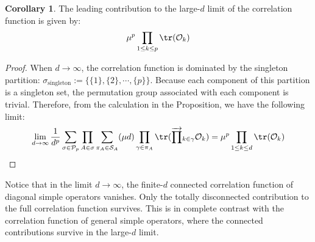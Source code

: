 \documentclass[a4paper,11pt]{article}
\theoremstyle{definition}
\numberwithin{equation}{section}
\newtheorem{corollary}[lemma]{Corollary}
\begin{document}
\begin{corollary}
    The leading contribution to the large-$d$ limit of the correlation function is given by:
    \begin{equation}
        \mu^p\prod_{1\leq k\leq  p}\tr(\mathcal{O}_k)
    \end{equation}
\end{corollary}
\begin{proof}
    When $d\rightarrow \infty$, the correlation function is dominated by the singleton partition: $\sigma_\text{singleton}:=\{\{1\},\{2\},\cdots,\{p\}\}$. Because each component of this partition is a singleton set, the permutation group associated with each component is trivial. Therefore, from the calculation in the Proposition, we have the following limit:
    \begin{align}
        \begin{split}
            \lim_{d\rightarrow\infty}\frac{1}{d^p}\sum_{\sigma\in\mathcal{P}_p}\prod_{A\in\sigma}\sum_{\pi_A\in\mathcal{S}_A}(\mu d)\prod_{\gamma\in\pi_A}\tr(\overrightarrow{\prod}_{k\in\gamma}\mathcal{O}_k) = \mu^p\prod_{1\leq k\leq d}\tr(\mathcal{O}_k)\qedhere
        \end{split}
    \end{align}
\end{proof}
Notice that in the limit $d\rightarrow\infty$, the finite-$d$ connected correlation function of diagonal simple operators vanishes. Only the totally disconnected contribution to the full correlation function survives. This is in complete contrast with the correlation function of general simple operators, where the connected contributions survive in the large-$d$ limit.
\end{document}
